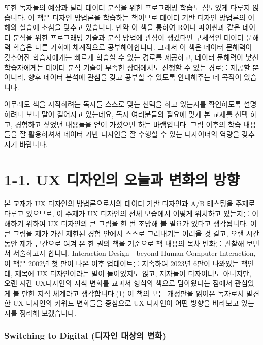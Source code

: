 \documentclass[
  letterpaper,
  DIV=11,
  numbers=noendperiod]{scrreprt}
\begin{document}
또한 독자들의 예상과 달리 데이터 분석을 위한 프로그래밍 학습도 심도있게
다루지 않습니다. 이 책은 디자인 방법론을 학습하는 책이므로 데이터 기반
디자인 방법론의 이해와 실습에 초첨을 맞추고 있습니다. 만약 이 책을
통하여 R이나 파이썬과 같은 데이터 분석을 위한 프로그래밍 기술과 분석
방법에 관심이 생겼다면 구체적인 데이터 문해력 학습은 다른 기회에
체계적으로 공부해야합니다. 그래서 이 책은 데이터 문해력이 갖추어진
학습자에게는 빠르게 학습할 수 있는 경로를 제공하고, 데이터 문해력이 낯선
학습자에게는 데이터 분석 기술이 부족한 상태에서도 진행할 수 있는 경로를
제공할 뿐 아니라, 향후 데이터 분석에 관심을 갖고 공부할 수 있도록
안내해주는 데 목적이 있습니다.

아무래도 책을 시작하려는 독자들 스스로 맞는 선택을 하고 있는지를
확인하도록 설명하려다 보니 말이 길어지고 있는데요, 독자 여러분들의
필요에 맞게 본 교재를 선택 하고, 경험하고 싶었던 내용들을 얻어 가셨으면
하는 바램입니다. 그럼 이후의 학습 내용들을 잘 활용하셔서 데이터 기반
디자인을 잘 수행할 수 있는 디자이너의 역량을 갖추시기 바랍니다.


\chapter{1-1. UX 디자인의 오늘과 변화의
방향}\label{ux-uxb514uxc790uxc778uxc758-uxc624uxb298uxacfc-uxbcc0uxd654uxc758-uxbc29uxd5a5}

본 교재가 UX 디자인의 방법론으로서의 데이터 기반 디자인과 A/B 테스팅을
주제로 다루고 있으므로, 이 주제가 UX 디자인의 전체 모습에서 어떻게
위치하고 있는지를 이해하기 위하여 UX 디자인의 큰 그림을 한 번 조망해 볼
필요가 있다고 생각됩니다. 이 큰 그림을 제가 가진 제한된 경험 안에서
스스로 그려내기는 어려울 것 같고, 오랜 시간동안 제가 근간으로 여겨 온 한
권의 책을 기준으로 책 내용의 목차 변화를 관찰해 보면서 서술하고자
합니다. Interaction Design - beyond Human-Computer Interaction, 이 책은
2002년 첫 판이 나온 이후 업데이트를 지속하여 2023년 6판이 나와있는
책인데, 제목에 UX 디자인이라는 말이 들어있지도 않고, 저자들이 디자이너도
아니지만, 오랜 시간 UX디자인의 지식 변화를 교과서 형식의 책으로
담아왔다는 점에서 관심있게 볼 만한 지식 체계라고 생각합니다.(1) 이 책의
모든 개정판을 읽어온 독자로서 발견한 UX 디자인의 키워드 변화들을
중심으로 UX 디자인이 어떤 방향을 바라보고 있는지를 정리해 보겠습니다.

\subsection{Switching to Digital (디자인 대상의
변화)}\label{switching-to-digital-uxb514uxc790uxc778-uxb300uxc0c1uxc758-uxbcc0uxd654}
\end{document}
